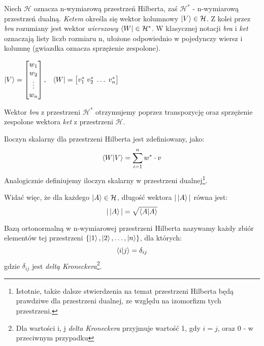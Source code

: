 \documentclass[12pt,a4paper,twoside,openany]{book}
\begin{document}
Niech $\mathcal{H}$ oznacza n-wymiarową przestrzeń Hilberta, zaś $\mathcal{H}^\ast$ - n-wymiarową przestrzeń dualną. \textit{Ketem} określa się wektor kolumnowy $\ket{V}\in\mathcal{H}$. Z kolei przez \textit{bra} rozumiany jest wektor \textit{wierszowy} $\bra{W}\in\mathcal{H}^\ast$. W klasycznej notacji \textit{bra} i \textit{ket} oznaczają listy liczb rozmiaru n, ułożone odpowiednio w pojedynczy wiersz i kolumnę (gwiazdka oznacza sprzężenie zespolone).
~\newline
~\newline
\begin{center}
    

$\ket{V} = \begin{bmatrix}
           w_{1} \\
           w_{2} \\
           \vdots \\
           w_{n}
           \end{bmatrix}, \;\;\; \bra{W} = \begin{bmatrix}
           v_{1}^\ast \; 
           v_{2}^\ast \;
           \hdots \;
           v_{n}^\ast
           \end{bmatrix}$
\end{center}

Wektor \textit{bra} z przestrzeni $\mathcal{H}^\ast$ otrzymujemy poprzez transpozycję oraz sprzężenie zespolone wektora \textit{ket} z przestrzeni $\mathcal{H}$.\newline

Iloczyn skalarny dla przestrzeni Hilberta jest zdefiniowany, jako:
\begin{equation}
\bra{W}\ket{V} = \sum_{i=1}^{n} w^\ast \cdot v
\end{equation}
Analogicznie definiujemy iloczyn skalarny w przestrzeni dualnej\footnote{Istotnie, także dalsze stwierdzenia na temat przestrzeni Hilberta będą prawdziwe dla przestrzeni dualnej, ze względu na izomorfizm tych przestrzeni.}.\newline

Widać więc, że dla każdego $\ket{A}\in\mathcal{H}$, długość wektora $|\ket{A}|$ równa jest:
\begin{equation}
    |\ket{A}| = \sqrt{\braket{A}}
\end{equation}

Bazą ortonormalną w n-wymiarowej przestrzeni Hilberta nazywamy każdy zbiór elementów tej przestrzeni $\{\ket{1}, \ket{2}, \hdots, \ket{n}\}$, dla których:
\begin{equation}
    \bra{i}\ket{j} = \delta_{ij}
\end{equation}
gdzie $\delta_{ij}$ jest \textit{deltą Kroneckera}\footnote{Dla wartości i, j \textit{delta Kroneckera} przyjmuje wartość 1, gdy $i = j$, oraz 0 - w przeciwnym przypadku}.
\end{document}
